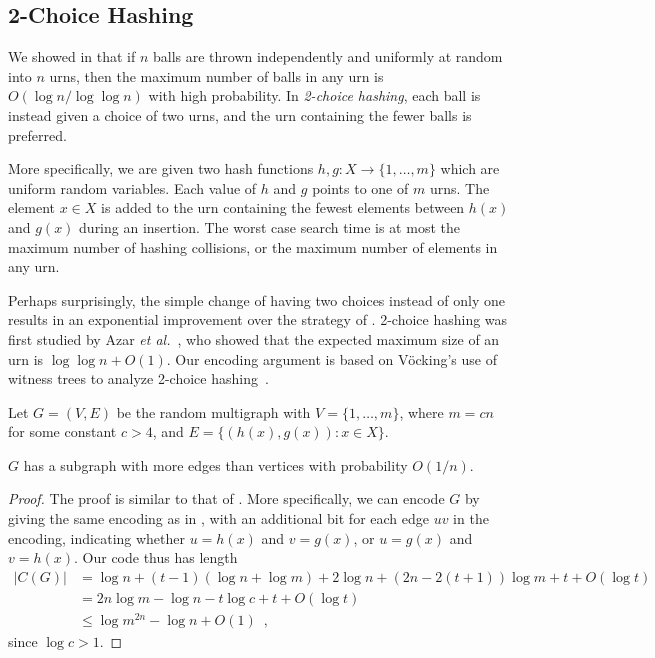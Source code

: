\documentclass{patmorin}
\begin{document}
\subsection{2-Choice Hashing}

We showed in  that if $n$ balls are thrown independently
and uniformly at random into $n$ urns, then the maximum number of
balls in any urn is $O(\log n/\log \log n)$ with high probability. In
\emph{2-choice hashing}, each ball is instead given a choice of two
urns, and the urn containing the fewer balls is preferred.

More specifically, we are given two hash functions $h, g : X \to \{1,
\ldots, m\}$ which are uniform random variables. Each value of $h$ and
$g$ points to one of $m$ urns. The element $x \in X$ is added to the
urn containing the fewest elements between $h(x)$ and $g(x)$ during an
insertion. The worst case search time is at most the maximum number of
hashing collisions, or the maximum number of elements in any urn.

Perhaps surprisingly, the simple change of having two choices instead
of only one results in an exponential improvement over the strategy of
. 2-choice hashing was first studied by Azar \emph{et
  al.}~\cite{azar:multiplechoice}, who showed that the expected
maximum size of an urn is $\log \log n + O(1)$. Our encoding argument
is based on V\"{o}cking's use of witness trees to analyze 2-choice
hashing~\cite{vocking:witness}.

Let $G = (V, E)$ be the random multigraph with $V = \{1, \ldots, m\}$,
where $m = cn$ for some constant $c > 4$, and
$E = \{(h(x), g(x)) : x \in X\}$.

\begin{lem}
  $G$ has a subgraph with more edges than vertices with probability
  $O(1/n)$.
\end{lem}
\begin{proof}
  The proof is similar to that of . More
  specifically, we can encode $G$ by giving the same encoding as in
  , with an additional bit for each edge $uv$
  in the encoding, indicating whether $u = h(x)$ and $v = g(x)$, or $u
  = g(x)$ and $v = h(x)$. Our code thus has length
  \begin{align*}
    |C(G)| &= \log n + (t - 1)(\log n + \log m) + 2 \log n + (2n - 2(t + 1))\log m + t + O(\log t) \\
           &= 2n \log m - \log n - t \log c + t + O(\log t) \\
           &\le \log m^{2n} - \log n + O(1) \enspace ,
  \end{align*}
  since $\log c > 1$.
\end{proof}
\end{document}
